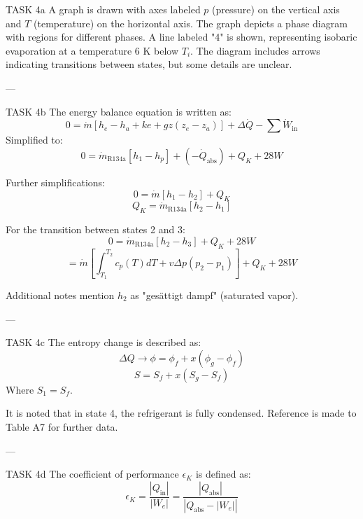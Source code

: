 TASK 4a  
A graph is drawn with axes labeled \( p \) (pressure) on the vertical axis and \( T \) (temperature) on the horizontal axis. The graph depicts a phase diagram with regions for different phases. A line labeled "4" is shown, representing isobaric evaporation at a temperature 6 K below \( T_i \). The diagram includes arrows indicating transitions between states, but some details are unclear.

---

TASK 4b  
The energy balance equation is written as:  
\[
0 = \dot{m} \left[ h_e - h_a + ke + gz(z_e - z_a) \right] + \Delta \dot{Q} - \sum \dot{W}_{\text{in}}
\]  
Simplified to:  
\[
0 = \dot{m}_{\text{R134a}} \left[ h_1 - h_p \right] + (-\dot{Q}_{\text{abs}}) + Q_K + 28W
\]  

Further simplifications:  
\[
0 = \dot{m} \left[ h_1 - h_2 \right] + Q_K
\]  
\[
Q_K = \dot{m}_{\text{R134a}} \left[ h_2 - h_1 \right]
\]  

For the transition between states 2 and 3:  
\[
0 = \dot{m}_{\text{R134a}} \left[ h_2 - h_3 \right] + Q_K + 28W
\]  
\[
= \dot{m} \left[ \int_{T_1}^{T_2} c_p(T) dT + v \Delta p (p_2 - p_1) \right] + Q_K + 28W
\]  

Additional notes mention \( h_2 \) as "gesättigt dampf" (saturated vapor).  

---

TASK 4c  
The entropy change is described as:  
\[
\Delta Q \rightarrow \phi = \phi_f + x (\phi_g - \phi_f)
\]  
\[
S = S_f + x (S_g - S_f)
\]  
Where \( S_1 = S_f \).  

It is noted that in state 4, the refrigerant is fully condensed. Reference is made to Table A7 for further data.

---

TASK 4d  
The coefficient of performance \( \epsilon_K \) is defined as:  
\[
\epsilon_K = \frac{\left| Q_{\text{in}} \right|}{\left| W_e \right|} = \frac{\left| Q_{\text{abs}} \right|}{\left| Q_{\text{abs}} - \left| W_e \right| \right|}
\]  